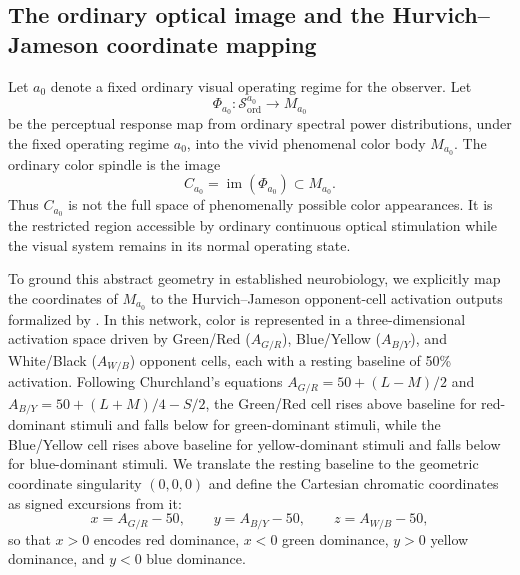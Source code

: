 \documentclass[preprint,12pt,authoryear]{elsarticle}
\theoremstyle{plain}
\theoremstyle{definition}
\theoremstyle{remark}
\begin{document}
\subsection{The ordinary optical image and the Hurvich--Jameson coordinate mapping}
\label{subsec:ordinary-optical-image}

Let $a_0$ denote a fixed ordinary visual operating regime for the observer. Let
\[
\Phi_{a_0}:\mathcal{S}_{\mathrm{ord}}^{a_0}\longrightarrow M_{a_0}
\]
be the perceptual response map from ordinary spectral power distributions, under the fixed operating regime $a_0$, into the vivid phenomenal color body $M_{a_0}$. The ordinary color spindle is the image
\[
C_{a_0}=\operatorname{im}(\Phi_{a_0})\subset M_{a_0}.
\]
Thus $C_{a_0}$ is not the full space of phenomenally possible color appearances. It is the restricted region accessible by ordinary continuous optical stimulation while the visual system remains in its normal operating state.

To ground this abstract geometry in established neurobiology, we explicitly map the coordinates of $M_{a_0}$ to the Hurvich--Jameson opponent-cell activation outputs formalized by \citet{Churchland2005}. In this network, color is represented in a three-dimensional activation space driven by Green/Red ($A_{G/R}$), Blue/Yellow ($A_{B/Y}$), and White/Black ($A_{W/B}$) opponent cells, each with a resting baseline of 50\% activation. Following Churchland's equations $A_{G/R}=50+(L-M)/2$ and $A_{B/Y}=50+(L+M)/4-S/2$, the Green/Red cell rises above baseline for red-dominant stimuli and falls below for green-dominant stimuli, while the Blue/Yellow cell rises above baseline for yellow-dominant stimuli and falls below for blue-dominant stimuli. We translate the resting baseline to the geometric coordinate singularity $(0,0,0)$ and define the Cartesian chromatic coordinates as signed excursions from it:
\[
x = A_{G/R} - 50,\qquad y = A_{B/Y} - 50,\qquad z = A_{W/B} - 50,
\]
so that $x>0$ encodes red dominance, $x<0$ green dominance, $y>0$ yellow dominance, and $y<0$ blue dominance.
\end{document}
